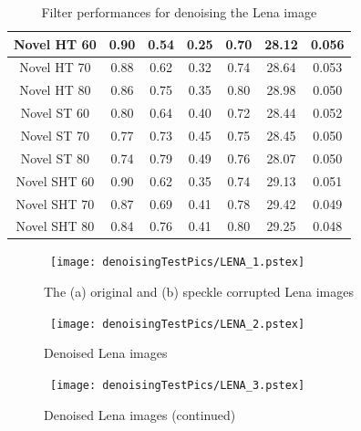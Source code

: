 \documentclass[12pt]{report}
\renewcommand{\baselinestretch}{1.5}
\begin{document}
\begin{table}[p]
\begin{center}
\begin{scriptsize}
\begin{tabular}{|c|c|c|c|c|c|c|}

Novel HT 60		& 0.90	& 0.54		& 0.25		& 0.70	& 28.12		& 0.056		\\ \hline
Novel HT 70		& 0.88	& 0.62		& 0.32		& 0.74	& 28.64		& 0.053		\\ \hline
Novel HT 80		& 0.86	& 0.75		& 0.35		& 0.80	& 28.98		& 0.050		\\ \hline \hline

Novel ST 60		& 0.80 	& 0.64		& 0.40		& 0.72	& 28.44		& 0.052		\\ \hline
Novel ST 70		& 0.77	& 0.73		& 0.45		& 0.75	& 28.45		& 0.050		\\ \hline
Novel ST 80 		& 0.74	& 0.79		& 0.49		& 0.76	& 28.07		& 0.050		\\ \hline \hline

Novel SHT 60		& 0.90	& 0.62		& 0.35		& 0.74	& 29.13		& 0.051		\\ \hline
Novel SHT 70		& 0.87	& 0.69		& 0.41		& 0.78	& 29.42		& 0.049		\\ \hline
Novel SHT 80		& 0.84	& 0.76		& 0.41		& 0.80	& 29.25		& 0.048		\\ \hline

\end{tabular}
\end{scriptsize}
\end{center}
\caption{Filter performances for denoising the Lena image}
\label{tab:LenaDN}
\renewcommand{\baselinestretch}{1.5}
\setlength{\abovecaptionskip}{0cm}
\end{table}

\begin{figure}[p]
	\centerline{ \hbox{
                \texttt{[image: denoisingTestPics/LENA\_1.pstex]}
	}}
        \caption{The (a) original and (b) speckle corrupted Lena images}
	\label{fig:lena_a}
\end{figure}
\begin{figure}[p]
	\centerline{ \hbox{
                \texttt{[image: denoisingTestPics/LENA\_2.pstex]}
	}}
        \caption{Denoised Lena images} 
	\label{fig:lena_b}
\end{figure}
\begin{figure}[p]
	\centerline{ \hbox{
                \texttt{[image: denoisingTestPics/LENA\_3.pstex]}
	}}
        \caption{Denoised Lena images (continued)} 
	\label{fig:lena_c}
\end{figure}
\end{document}
